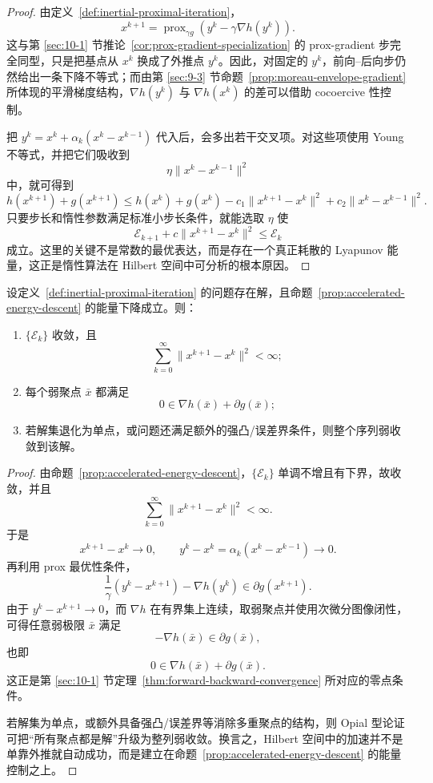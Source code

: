 \begin{proof}
由定义~\ref{def:inertial-proximal-iteration}，
\[
x^{k+1}=\operatorname{prox}_{\gamma g}(y^k-\gamma \nabla h(y^k)).
\]
这与第 \ref{sec:10-1} 节推论~\ref{cor:prox-gradient-specialization} 的 prox-gradient 步完全同型，只是把基点从 $x^k$ 换成了外推点 $y^k$。因此，对固定的 $y^k$，前向--后向步仍然给出一条下降不等式；而由第 \ref{sec:9-3} 节命题~\ref{prop:moreau-envelope-gradient} 所体现的平滑梯度结构，$\nabla h(y^k)$ 与 $\nabla h(x^k)$ 的差可以借助 cocoercive 性控制。

把 $y^k=x^k+\alpha_k(x^k-x^{k-1})$ 代入后，会多出若干交叉项。对这些项使用 Young 不等式，并把它们吸收到
\[
\eta\|x^k-x^{k-1}\|^2
\]
中，就可得到
\[
h(x^{k+1})+g(x^{k+1})
\le
h(x^k)+g(x^k)-c_1\|x^{k+1}-x^k\|^2+c_2\|x^k-x^{k-1}\|^2.
\]
只要步长和惰性参数满足标准小步长条件，就能选取 $\eta$ 使
\[
\mathcal E_{k+1}+c\|x^{k+1}-x^k\|^2\le \mathcal E_k
\]
成立。这里的关键不是常数的最优表达，而是存在一个真正耗散的 Lyapunov 能量，这正是惰性算法在 Hilbert 空间中可分析的根本原因。
\end{proof}

\begin{theorem}\label{thm:hilbert-acceleration-template}
设定义~\ref{def:inertial-proximal-iteration} 的问题存在解，且命题~\ref{prop:accelerated-energy-descent} 的能量下降成立。则：
\begin{enumerate}
  \item $\{\mathcal E_k\}$ 收敛，且
  \[
  \sum_{k=0}^{\infty}\|x^{k+1}-x^k\|^2<\infty;
  \]
  \item 每个弱聚点 $\bar x$ 都满足
  \[
  0\in \nabla h(\bar x)+\partial g(\bar x);
  \]
  \item 若解集退化为单点，或问题还满足额外的强凸/误差界条件，则整个序列弱收敛到该解。
\end{enumerate}
\end{theorem}

\begin{proof}
由命题~\ref{prop:accelerated-energy-descent}，$\{\mathcal E_k\}$ 单调不增且有下界，故收敛，并且
\[
\sum_{k=0}^{\infty}\|x^{k+1}-x^k\|^2<\infty.
\]
于是
\[
x^{k+1}-x^k\to 0,
\qquad
y^k-x^k=\alpha_k(x^k-x^{k-1})\to 0.
\]
再利用 prox 最优性条件，
\[
\frac{1}{\gamma}(y^k-x^{k+1})-\nabla h(y^k)\in \partial g(x^{k+1}).
\]
由于 $y^k-x^{k+1}\to 0$，而 $\nabla h$ 在有界集上连续，取弱聚点并使用次微分图像闭性，可得任意弱极限 $\bar x$ 满足
\[
-\nabla h(\bar x)\in \partial g(\bar x),
\]
也即
\[
0\in \nabla h(\bar x)+\partial g(\bar x).
\]
这正是第 \ref{sec:10-1} 节定理~\ref{thm:forward-backward-convergence} 所对应的零点条件。

若解集为单点，或额外具备强凸/误差界等消除多重聚点的结构，则 Opial 型论证可把“所有聚点都是解”升级为整列弱收敛。换言之，Hilbert 空间中的加速并不是单靠外推就自动成功，而是建立在命题~\ref{prop:accelerated-energy-descent} 的能量控制之上。
\end{proof}

